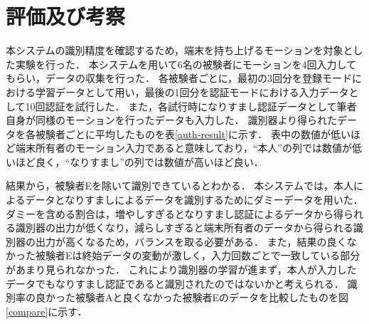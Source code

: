 \section{評価及び考察}
本システムの識別精度を確認するため，端末を持ち上げるモーションを対象とした実験を行った．
本システムを用いて6名の被験者にモーションを4回入力してもらい，データの収集を行った．
各被験者ごとに，最初の3回分を登録モードにおける学習データとして用い，最後の1回分を認証モードにおける入力データとして10回認証を試行した．
また，各試行時になりすまし認証データとして筆者自身が同様のモーションを行ったデータも入力した．
識別器より得られたデータを各被験者ごとに平均したものを表\ref{auth-result}に示す．
表中の数値が低いほど端末所有者のモーション入力であると意味しており，``本人''の列では数値が低いほど良く，``なりすまし''の列では数値が高いほど良い．

結果から，被験者Eを除いて識別できているとわかる．
本システムでは，本人によるデータとなりすましによるデータを識別するためにダミーデータを用いた．
ダミーを含める割合は，増やしすぎるとなりすまし認証によるデータから得られる識別器の出力が低くなり，減らしすぎると端末所有者のデータから得られる識別器の出力が高くなるため，バランスを取る必要がある．
また，結果の良くなかった被験者Eは終始データの変動が激しく，入力回数ごとで一致している部分があまり見られなかった．
これにより識別器の学習が進まず，本人が入力したデータでもなりすまし認証であると識別されたのではないかと考えられる．
識別率の良かった被験者Aと良くなかった被験者Eのデータを比較したものを図\ref{compare}に示す．

